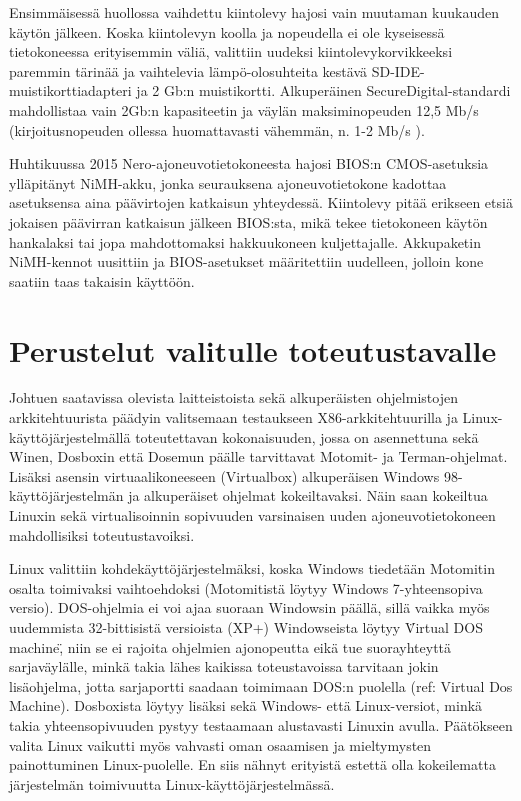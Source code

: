 Ensimmäisessä huollossa vaihdettu kiintolevy hajosi vain muutaman kuukauden käytön jälkeen. Koska kiintolevyn koolla ja nopeudella ei ole kyseisessä tietokoneessa erityisemmin väliä, valittiin uudeksi kiintolevykorvikkeeksi paremmin tärinää ja vaihtelevia lämpö-olosuhteita kestävä SD-IDE-muistikorttiadapteri ja 2 Gb:n muistikortti. Alkuperäinen SecureDigital-standardi mahdollistaa vain 2Gb:n kapasiteetin ja väylän maksiminopeuden 12,5 Mb/s (kirjoitusnopeuden ollessa huomattavasti vähemmän, n. 1-2 Mb/s )\cite{sd:2gb}.

Huhtikuussa 2015 Nero-ajoneuvotietokoneesta hajosi BIOS:n CMOS-asetuksia ylläpitänyt NiMH-akku, jonka seurauksena ajoneuvotietokone kadottaa asetuksensa aina päävirtojen katkaisun yhteydessä. Kiintolevy pitää erikseen etsiä jokaisen päävirran katkaisun jälkeen BIOS:sta, mikä tekee tietokoneen käytön hankalaksi tai jopa mahdottomaksi hakkuukoneen kuljettajalle. Akkupaketin NiMH-kennot uusittiin ja BIOS-asetukset määritettiin uudelleen, jolloin kone saatiin taas takaisin käyttöön.

\section{Perustelut valitulle toteutustavalle}

Johtuen saatavissa olevista laitteistoista sekä alkuperäisten ohjelmistojen arkkitehtuurista päädyin valitsemaan testaukseen X86-arkkitehtuurilla ja Linux-käyttöjärjestelmällä toteutettavan kokonaisuuden, jossa on asennettuna sekä Winen, Dosboxin että Dosemun päälle tarvittavat Motomit- ja Terman-ohjelmat. Lisäksi asensin virtuaalikoneeseen (Virtualbox) alkuperäisen Windows 98-käyttöjärjestelmän ja alkuperäiset ohjelmat kokeiltavaksi. Näin saan kokeiltua Linuxin sekä virtualisoinnin sopivuuden varsinaisen uuden ajoneuvotietokoneen mahdollisiksi toteutustavoiksi.

Linux valittiin kohdekäyttöjärjestelmäksi, koska Windows tiedetään Motomitin osalta toimivaksi vaihtoehdoksi (Motomitistä löytyy Windows 7-yhteensopiva versio). DOS-ohjelmia ei voi ajaa suoraan Windowsin päällä, sillä vaikka myös uudemmista 32-bittisistä versioista (XP+) Windowseista löytyy \"Virtual DOS machine\", niin se ei rajoita ohjelmien ajonopeutta eikä tue suorayhteyttä sarjaväylälle, minkä takia lähes kaikissa toteustavoissa tarvitaan jokin lisäohjelma, jotta sarjaportti saadaan toimimaan DOS:n puolella (ref: Virtual Dos Machine). Dosboxista löytyy lisäksi sekä Windows- että Linux-versiot, minkä takia yhteensopivuuden pystyy testaamaan alustavasti Linuxin avulla. Päätökseen valita Linux vaikutti myös vahvasti oman osaamisen ja mieltymysten painottuminen Linux-puolelle. En siis nähnyt erityistä estettä olla kokeilematta järjestelmän toimivuutta Linux-käyttöjärjestelmässä.

